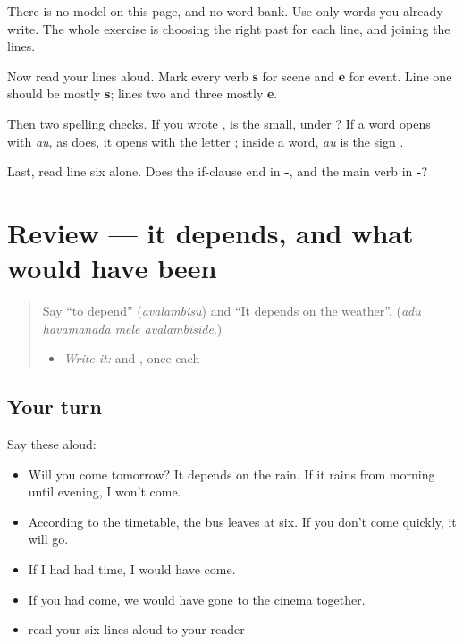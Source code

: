 There is no model on this page, and no word bank. Use only words you already write. The whole exercise is choosing the right past for each line, and joining the lines.

\begin{tcolorbox}[breakable,colback=teal!4,colframe=teal!35!black,title={Before you move on}]
Now read your lines aloud. Mark every verb \textbf{s} for scene and \textbf{e} for event. Line one should be mostly \textbf{s}; lines two and three mostly \textbf{e}.

Then two spelling checks. If you wrote \textbf{}, is the \textbf{} small, under \textbf{}? If a word opens with \emph{au}, as \textbf{} does, it opens with the letter \textbf{}; inside a word, \emph{au} is the sign \textbf{}.

Last, read line six alone. Does the if-clause end in \textbf{-}, and the main verb in \textbf{-}?
\end{tcolorbox}
\section[(review)]{Review — it depends, and what would have been}

\label{lesson:KA-R318-depends-and-would}



\begin{quote}
Say \textquotedblleft{}to depend\textquotedblright{} (\emph{avalambisu}) and \textquotedblleft{}It depends on the weather\textquotedblright{}. (\emph{adu havāmānada mēle avalambiside}.)

\begin{itemize}
\raggedright
  \item \emph{Write it:} \textbf{} and \textbf{}, once each
\end{itemize}
\end{quote}

\subsection*{Your turn}
Say these aloud:

\begin{itemize}
\raggedright
  \item Will you come tomorrow? It depends on the rain. If it rains from morning until evening, I won't come.
  \item According to the timetable, the bus leaves at six. If you don't come quickly, it will go.
  \item If I had had time, I would have come.
  \item If you had come, we would have gone to the cinema together.
  \item read your six lines aloud to your reader
\end{itemize}


